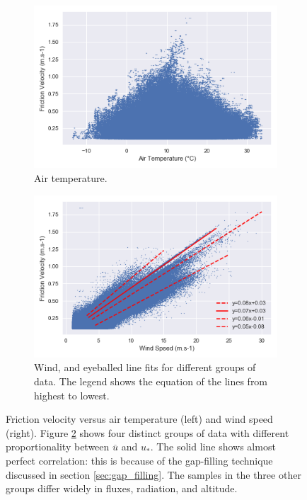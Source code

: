 \documentclass[a4paper,11pt]{kth-mag}
\begin{document}
\begin{figure}
    \centering
    \begin{subfigure}[t]{0.48\textwidth}
        \centering
        \includegraphics[width=\textwidth]{images/ustar_temp}
        \caption{Air temperature. }
        \label{fig:ustar_temp}
    \end{subfigure}
    \hfill
    \begin{subfigure}[t]{0.48\textwidth}
        \centering
        \includegraphics[width=\textwidth]{images/ustar_wind}
        \caption{Wind, and eyeballed line fits for different groups of data. The legend shows the equation of the lines from highest to lowest.}
        \label{fig:ustar_wind}
    \end{subfigure}
    \caption{Friction velocity versus air temperature (left) and wind speed (right). Figure \ref{fig:ustar_wind} shows four distinct groups of data with different proportionality between $\overline{u}$ and $u_*$. The solid line shows almost perfect correlation: this is because of the gap-filling technique discussed in section \ref{sec:gap_filling}. The samples in the three other groups differ widely in fluxes, radiation, and altitude.}
	\label{fig:ustar_wind_temp}
\end{figure}
\end{document}
